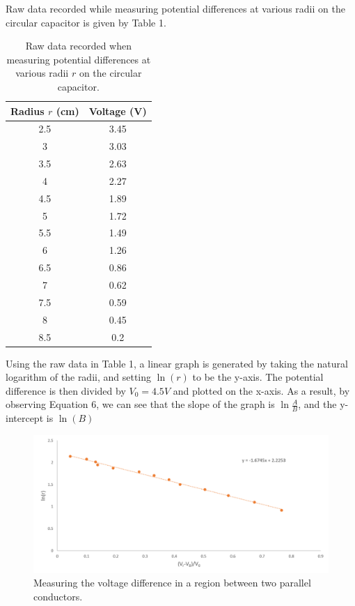 \documentclass[letterpaper]{article}
\begin{document}
Raw data recorded while measuring potential differences at various radii on
the circular capacitor is given by Table 1.
\begin{table}[H]
\centering
\begin{tabular}{|c|c|}
\hline
 Radius $r$ (cm) & Voltage (V)\\ \hline
 2.5         & 3.45        \\ \hline
 3           & 3.03        \\ \hline
 3.5         & 2.63        \\ \hline
 4           & 2.27        \\ \hline
 4.5         & 1.89        \\ \hline
 5           & 1.72        \\ \hline
 5.5         & 1.49        \\ \hline
 6           & 1.26        \\ \hline
 6.5         & 0.86        \\ \hline
 7           & 0.62        \\ \hline
 7.5         & 0.59        \\ \hline
 8           & 0.45        \\ \hline
 8.5         & 0.2         \\ \hline
\end{tabular}
\caption{Raw data recorded when measuring potential differences at various radii $r$ on the circular capacitor.}
\end{table}

Using the raw data in Table 1, a linear graph is generated by taking the natural logarithm of the
radii, and setting $\ln{(r)}$ to be the y-axis. The potential difference is then divided by $V_0=4.5 V$
and plotted on the x-axis. As a result, by observing Equation 6, we can see that the
slope of the graph is $\ln{\frac{A}{B}}$, and the y-intercept is $\ln{(B)}$
\begin{figure}[H]
  \centering
  \includegraphics[width=\textwidth]{chart1.png}
  \caption{Measuring the voltage difference in a region between two parallel conductors.}
\end{figure}
\end{document}
